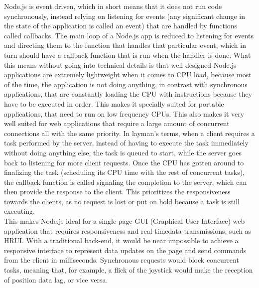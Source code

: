 Node.js is event driven, which in short means that it does not run code synchronously, instead relying on listening for events
(any significant change in the state of the application is called an event) that are handled by functions called callbacks.
The main loop of a Node.js app is reduced to listening for events and directing them to the function that handles that particular
event, which in turn should have a callback function that is run when the handler is done. What this means without going into
technical details is that well designed Node.js applications are extremely lightweight when it comes to CPU load, because most
of the time, the application is not doing anything, in contrast with synchronous applications, that are constantly loading the
CPU with instructions because they have to be executed in order. This makes it specially suited for portable applications,
that need to run on low frequency CPUs. This also makes it very well suited for web applications that require a large amount
of concurrent connections all with the same priority. In layman's terms, when a client requires a task performed by the
server, instead of having to execute the task immediately without doing anything else, the task is queued to start, while the
server goes back to listening for more client requests. Once the CPU has gotten around to finalizing the task (scheduling its
CPU time with the rest of concurrent tasks), the callback function is called signaling the completion to the server, which can
then provide the response to the client. This prioritizes the responsiveness towards the clients, as no request is lost or put
on hold because a task is still executing.\\

This makes Node.js ideal for a single-page GUI (Graphical User Interface) web application that requires responsiveness and 
real-timedata transmissions, such as HRUI. With a traditional back-end, it would be near impossible to achieve a responsive
interface to represent data updates on the page and send commands from the client in milliseconds. Synchronous requests would
block concurrent tasks, meaning that, for example, a flick of the joystick would make the reception of position data lag, or
vice versa.\\


